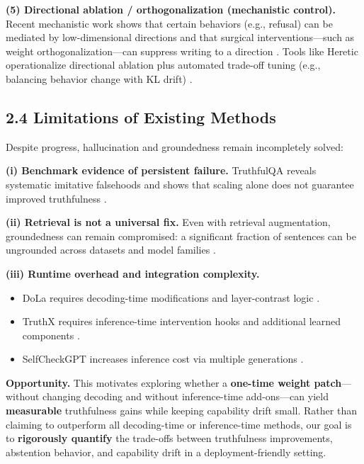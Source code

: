 \textbf{(5) Directional ablation / orthogonalization (mechanistic control).} Recent mechanistic work shows that certain behaviors (e.g., refusal) can be mediated by low-dimensional directions and that surgical interventions—such as weight orthogonalization—can suppress writing to a direction \citep{arditi2024refusal}. Tools like Heretic operationalize directional ablation plus automated trade-off tuning (e.g., balancing behavior change with KL drift) \citep{heretic}.


\subsection*{2.4 Limitations of Existing Methods}

Despite progress, hallucination and groundedness remain incompletely solved:

\textbf{(i) Benchmark evidence of persistent failure.} TruthfulQA reveals systematic imitative falsehoods and shows that scaling alone does not guarantee improved truthfulness \citep{lin2022truthfulqa}.

\textbf{(ii) Retrieval is not a universal fix.} Even with retrieval augmentation, groundedness can remain compromised: a significant fraction of sentences can be ungrounded across datasets and model families \citep{stolfo2024groundedness}.

\textbf{(iii) Runtime overhead and integration complexity.}
\begin{itemize}
  \item DoLa requires decoding-time modifications and layer-contrast logic \citep{chuang2024dola}.
  \item TruthX requires inference-time intervention hooks and additional learned components \citep{zhang2024truthx}.
  \item SelfCheckGPT increases inference cost via multiple generations \citep{manakul2023selfcheckgpt}.
\end{itemize}

\textbf{Opportunity.} This motivates exploring whether a \textbf{one-time weight patch}—without changing decoding and without inference-time add-ons—can yield \textbf{measurable} truthfulness gains while keeping capability drift small. Rather than claiming to outperform all decoding-time or inference-time methods, our goal is to \textbf{rigorously quantify} the trade-offs between truthfulness improvements, abstention behavior, and capability drift in a deployment-friendly setting.

